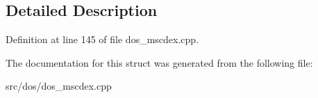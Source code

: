 \subsection{Detailed Description}


Definition at line 145 of file dos\-\_\-mscdex.\-cpp.



The documentation for this struct was generated from the following file\-:\begin{DoxyCompactItemize}
\item 
src/dos/dos\-\_\-mscdex.\-cpp\end{DoxyCompactItemize}
